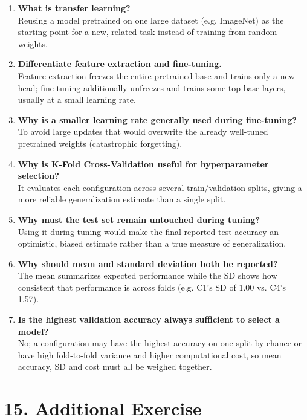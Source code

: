 \documentclass[10pt]{article}
\begin{document}
\begin{enumerate}
\item \textbf{What is transfer learning?}\\
Reusing a model pretrained on one large dataset (e.g. ImageNet) as the starting point for a new, related task instead of training from random weights.

\item \textbf{Differentiate feature extraction and fine-tuning.}\\
Feature extraction freezes the entire pretrained base and trains only a new head; fine-tuning additionally unfreezes and trains some top base layers, usually at a small learning rate.

\item \textbf{Why is a smaller learning rate generally used during fine-tuning?}\\
To avoid large updates that would overwrite the already well-tuned pretrained weights (catastrophic forgetting).

\item \textbf{Why is K-Fold Cross-Validation useful for hyperparameter selection?}\\
It evaluates each configuration across several train/validation splits, giving a more reliable generalization estimate than a single split.

\item \textbf{Why must the test set remain untouched during tuning?}\\
Using it during tuning would make the final reported test accuracy an optimistic, biased estimate rather than a true measure of generalization.

\item \textbf{Why should mean and standard deviation both be reported?}\\
The mean summarizes expected performance while the SD shows how consistent that performance is across folds (e.g. C1's SD of 1.00 vs. C4's 1.57).

\item \textbf{Is the highest validation accuracy always sufficient to select a model?}\\
No; a configuration may have the highest accuracy on one split by chance or have high fold-to-fold variance and higher computational cost, so mean accuracy, SD and cost must all be weighed together.
\end{enumerate}

\section*{15. Additional Exercise}
\end{document}
